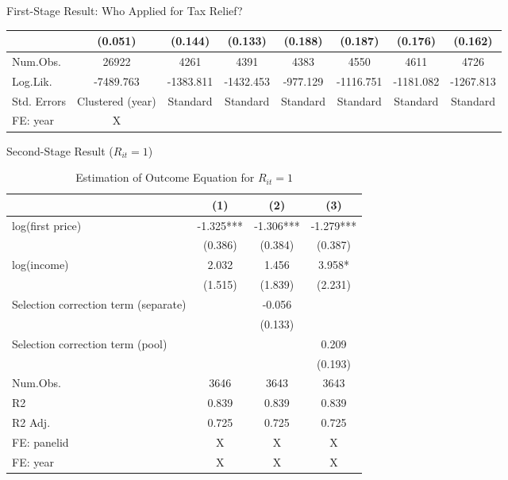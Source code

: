 \documentclass[
  ignorenonframetext,
  aspectratio=169,
]{beamer}
\begin{document}
\begin{frame}{First-Stage Result: Who Applied for Tax Relief?}
\begin{table}
\begin{tabular}[t]{lccccccc}
 & (0.051) & (0.144) & (0.133) & (0.188) & (0.187) & (0.176) & (0.162)\\
\midrule
Num.Obs. & 26922 & 4261 & 4391 & 4383 & 4550 & 4611 & 4726\\
Log.Lik. & -7489.763 & -1383.811 & -1432.453 & -977.129 & -1116.751 & -1181.082 & -1267.813\\
Std. Errors & Clustered (year) & Standard & Standard & Standard & Standard & Standard & Standard\\
FE: year & X &  &  &  &  &  & \\
\bottomrule
\end{tabular}
\end{table}
\end{frame}

\begin{frame}{Second-Stage Result (\(R_{it} = 1\))}
\protect\hypertarget{second-stage-result-r_it-1}{}
\begin{table}

\caption{\label{tab:unnamed-chunk-21}Estimation of Outcome Equation for $R_{it} = 1$}
\centering
\fontsize{7}{9}\selectfont
\begin{tabular}[t]{lccc}
\toprule
  & (1) & (2) & (3)\\
\midrule
log(first price) & -1.325*** & -1.306*** & -1.279***\\
 & (0.386) & (0.384) & (0.387)\\
log(income) & 2.032 & 1.456 & 3.958*\\
 & (1.515) & (1.839) & (2.231)\\
Selection correction term (separate) &  & -0.056 & \\
 &  & (0.133) & \\
Selection correction term (pool) &  &  & 0.209\\
 &  &  & (0.193)\\
\midrule
Num.Obs. & 3646 & 3643 & 3643\\
R2 & 0.839 & 0.839 & 0.839\\
R2 Adj. & 0.725 & 0.725 & 0.725\\
FE: panelid & X & X & X\\
FE: year & X & X & X\\
\bottomrule
\end{tabular}
\end{table}
\end{frame}
\end{document}

